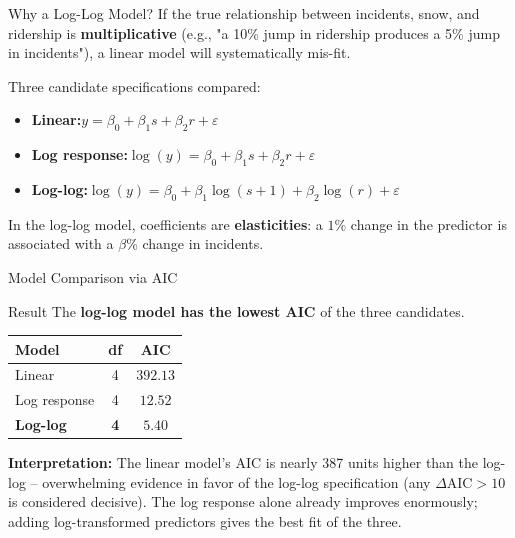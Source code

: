 \documentclass[aspectratio=43]{beamer}
\begin{document}
\begin{frame}{Why a Log-Log Model?}
If the true relationship between incidents, snow, and ridership is \textbf{multiplicative} (e.g., "a 10\% jump in ridership produces a 5\% jump in incidents"), a linear model will systematically mis-fit.

\vspace{0.2cm}
Three candidate specifications compared:
\begin{itemize}
  \item \textbf{Linear:}\quad $y = \beta_0 + \beta_1 s + \beta_2 r + \varepsilon$
  \item \textbf{Log response:}\quad $\log(y) = \beta_0 + \beta_1 s + \beta_2 r + \varepsilon$
  \item \textbf{Log-log:}\quad $\log(y) = \beta_0 + \beta_1 \log(s+1) + \beta_2 \log(r) + \varepsilon$
\end{itemize}

\vspace{0.2cm}
In the log-log model, coefficients are \textbf{elasticities}: a $1\%$ change in the predictor is associated with a $\beta\%$ change in incidents.
\end{frame}

\begin{frame}{Model Comparison via AIC}
\begin{block}{Result}
The \textbf{log-log model has the lowest AIC} of the three candidates.
\end{block}

\vspace{0.1cm}
\begin{center}
\begin{tabular}{lcc}
\toprule
\textbf{Model} & \textbf{df} & \textbf{AIC} \\
\midrule
Linear       & 4 & $392.13$ \\
Log response & 4 & $12.52$  \\
\textbf{Log-log} & \textbf{4} & $\mathbf{5.40}$ \\
\bottomrule
\end{tabular}
\end{center}

\vspace{0.15cm}
\textbf{Interpretation:} The linear model's AIC is nearly 387 units higher than the log-log -- overwhelming evidence in favor of the log-log specification (any $\Delta\text{AIC} > 10$ is considered decisive). The log response alone already improves enormously; adding log-transformed predictors gives the best fit of the three.
\end{frame}
\end{document}
